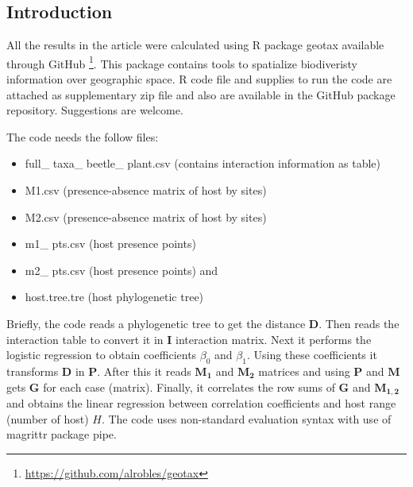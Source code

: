 \documentclass[utf8]{frontiers_suppmat} %
\begin{document}
\subsection{Introduction}

All the results in the article were calculated using R package geotax available through GitHub \footnote{\url{https://github.com/alrobles/geotax}}. This package contains tools to spatialize biodiveristy information over geographic space. R code file and supplies to run the code are attached as supplementary zip file and also are available in the GitHub package repository. Suggestions are welcome. 

The code needs the follow files: 

\begin{itemize}
	\item full\_ taxa\_ beetle\_ plant.csv (contains interaction information as table)
	\item M1.csv (presence-absence matrix of host by sites)
	\item M2.csv (presence-absence matrix of host by sites)
	\item m1\_ pts.csv (host presence points)
	\item m2\_ pts.csv (host presence points) and
	\item host.tree.tre (host phylogenetic tree)

\end{itemize}

Briefly, the code reads a phylogenetic tree to get the distance $\mathbf{D}$. Then reads the interaction table to convert it in $\mathbf{I}$ interaction matrix. Next it performs the logistic regression to obtain coefficients $\beta_0$ and $\beta_1$. Using these coefficients it transforms $\mathbf{D}$ in $\mathbf{P}$. After this it reads $\mathbf{M_1}$ and $\mathbf{M_2}$ matrices and using $\mathbf{P}$ and $\mathbf{M}$ gets $\mathbf{G}$ for each case (matrix). Finally, it correlates the row sums of $\mathbf{G}$ and $\mathbf{M_{1,2}}$ and obtains the linear regression between correlation coefficients and host range (number of host) $H$. The code uses non-standard evaluation syntax with use of magrittr package pipe.
\end{document}
